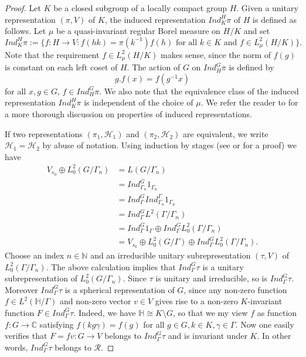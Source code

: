 \documentclass[12pt]{article}
\newcommand{\NN}{\mathbb{N}}
\newcommand{\CC}{\mathbb{C}}
\newcommand{\HH}{\mathbb{H}}
\begin{document}
\begin{proof} Let $ K $ be a closed subgroup of a locally compact group $ H $. Given a unitary representation $ (\pi, V) $ of $ K $, the induced representation $ Ind_{K}^{H} \pi $ of $ H $ is defined as follows. Let $ \mu $ be a quasi-invariant regular Borel measure on $ H/K $ and set
\begin{equation}\label{induced representation}
Ind_{K}^{H} \pi := \{ f : H\to V : f(hk) = \pi(k^{-1})f(h) \text{ for all } k\in K \text{ and } f\in L^{2}_{\mu}(H/K) \}.
\end{equation}
Note that the requirement $ f\in L^{2}_{\mu}(H/K) $ makes sense, since the norm of $ f(g) $ is constant on each left coset of $ H $. The action of $ G $ on $ Ind_{H}^{G} \pi $ is defined by
$$ g.f(x) = f(g^{-1}x) $$ 
for all $ x,g\in G $, $ f\in Ind_{H}^{G} \pi. $ We also note that the equivalence class of the induced representation $ Ind_{K}^{H} \pi $ is independent of the choice of $ \mu $. We refer the reader to \cite[Chapter~E]{Property(T)} for a more thorough discussion on properties of induced representations.

If two representations $ (\pi_{1}, \mathcal{H}_{1}) $ and $ (\pi_{2}, \mathcal{H}_{2}) $ are equivalent, we write $ \mathcal{H}_{1} = \mathcal{H}_{2} $ by abuse of notation. Using induction by stages (see \cite{Folla-95} or \cite{Gaal-73} for a proof) we have
\begin{align*}
V_{s_{0}} \oplus L_{0}^{2}(G/\Gamma_{n}) &= L(G/\Gamma_{n})\\
&= Ind_{\Gamma_{n}}^{G} 1_{\Gamma_{n}}\\
&= Ind_{\Gamma}^{G} Ind_{\Gamma_{n}}^{\Gamma} 1_{\Gamma_{n}}\\
&= Ind_{\Gamma}^{G} L^{2}(\Gamma/\Gamma_{n})\\
&= Ind_{\Gamma}^{G} 1_{\Gamma} \oplus Ind_{\Gamma}^{G} L_{0}^{2}(\Gamma/\Gamma_{n})\\
&= V_{s_{0}} \oplus L_{0}^{2}(G/\Gamma) \oplus Ind_{\Gamma}^{G} L_{0}^{2}(\Gamma/\Gamma_{n}).
\end{align*}
Choose an index $ n\in \NN $ and an irreducible unitary subrepresentation $ (\tau, V) $ of $ L_{0}^{2}(\Gamma/\Gamma_{n}) $. The above calculation implies that $ Ind_{\Gamma}^{G} \tau $ is a unitary subrepresentation of $ L_{0}^{2}(G/\Gamma_{n}) $. Since $ \tau $ is unitary and irreducible, so is $ Ind_{\Gamma}^{G} \tau $. Moreover $ Ind_{\Gamma}^{G} \tau $ is a spherical representation of $ G $, since any non-zero function $ f\in L^{2}(\HH/\Gamma) $ and non-zero vector $ v\in V $ gives rise to a non-zero $ K $-invariant function $ F\in Ind_{\Gamma}^{G} \tau $. Indeed, we have $ \HH \cong K\setminus G $, so that we my view $ f $ as function $ f : G\to \CC $ satisfying $ f(kg\gamma) = f(g) $ for all $ g\in G, k\in K, \gamma\in \Gamma $. Now one easily verifies that $ F = fv : G\to V $ belongs to $ Ind_{\Gamma}^{G} \tau $ and is invariant under $ K $. In other words, $ Ind_{\Gamma}^{G} \tau $ belongs to $ \mathcal{R} $.


\end{proof}
\end{document}
